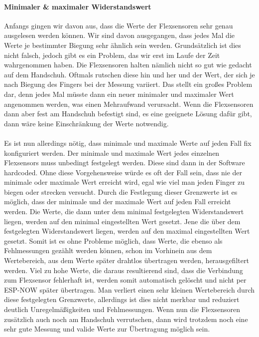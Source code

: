 \documentclass[titlepage,12pt,twoside]{article}
\begin{document}
\paragraph{Minimaler \& maximaler Widerstandswert}
\hfill \break
\hfill \break
Anfangs gingen wir davon aus, dass die Werte der Flexsensoren sehr genau ausgelesen werden können. Wir sind davon ausgegangen, 
dass jedes Mal die Werte je bestimmter Biegung sehr ähnlich sein werden. Grundsätzlich ist dies nicht falsch, jedoch gibt es 
ein Problem, das wir erst im Laufe der Zeit wahrgenommen haben. Die Flexsensoren halten nämlich nicht so gut wie gedacht auf 
dem Handschuh. Oftmals rutschen diese hin und her und der Wert, der sich je nach Biegung des Fingers bei der Messung variiert. 
Das stellt ein großes Problem dar, denn jedes Mal müsste dann ein neuer minimaler und maximaler Wert angenommen werden, was 
einen Mehraufwand verursacht. Wenn die Flexsensoren dann aber fest am Handschuh befestigt sind, es eine geeignete Lösung dafür 
gibt, dann wäre keine Einschränkung der Werte notwendig. \\
\\
Es ist nun allerdings nötig, dass minimale und maximale Werte auf jeden Fall fix konfiguriert werden. Der minimale und maximale Wert 
jedes einzelnen Flexsensors muss unbedingt festgelegt werden. Diese sind dann in der Software hardcoded. Ohne diese Vorgehensweise würde es oft der Fall sein, dass nie 
der minimale oder maximale Wert erreicht wird, egal wie viel man jeden Finger zu biegen oder strecken versucht. Durch die 
Festlegung dieser Grenzwerte ist es möglich, dass der minimale und der maximale Wert auf jeden Fall erreicht werden. Die Werte, 
die dann unter dem minimal festgelegten Widerstandswert liegen, werden auf den minimal eingestellten Wert gesetzt. Jene die 
über dem festgelegten Widerstandswert liegen, werden auf den maximal eingestellten Wert gesetzt. Somit ist es ohne Probleme 
möglich, dass Werte, die ebenso als Fehlmessungen gezählt werden können, schon im Vorhinein aus dem Wertebereich, aus dem Werte 
später drahtlos übertragen werden, herausgefiltert werden. Viel zu hohe Werte, die daraus resultierend sind, dass die Verbindung 
zum Flexsensor fehlerhaft ist, werden somit automatisch gelöscht und nicht per ESP-NOW später übertragen. Man verliert einen 
sehr kleinen Wertebereich durch diese festgelegten Grenzwerte, allerdings ist dies nicht merkbar und reduziert deutlich 
Unregelmäßigkeiten und Fehlmessungen. Wenn nun die Flexsensoren zusätzlich auch noch am Handschuh verrutschen, dann wird 
trotzdem noch eine sehr gute Messung und valide Werte zur Übertragung möglich sein. \\
\end{document}
